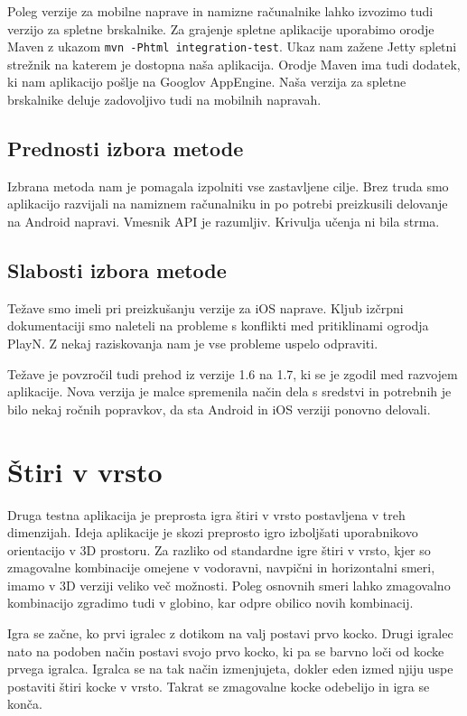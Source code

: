 Poleg verzije za mobilne naprave in namizne računalnike lahko izvozimo tudi verzijo za spletne brskalnike. Za grajenje spletne aplikacije uporabimo orodje Maven z ukazom \texttt{mvn -Phtml integration-test}. Ukaz nam zažene Jetty spletni strežnik na katerem je dostopna naša aplikacija. Orodje Maven ima tudi dodatek, ki nam aplikacijo pošlje na Googlov AppEngine. Naša verzija za spletne brskalnike deluje zadovoljivo tudi na mobilnih napravah.

\subsection{Prednosti izbora metode}

Izbrana metoda nam je pomagala izpolniti vse zastavljene cilje. Brez truda smo aplikacijo razvijali na namiznem računalniku in po potrebi preizkusili delovanje na Android napravi. Vmesnik API je razumljiv. Krivulja učenja ni bila strma. 

\subsection{Slabosti izbora metode}

Težave smo imeli pri preizkušanju verzije za iOS naprave. Kljub izčrpni dokumentaciji smo naleteli na probleme s konflikti med pritiklinami ogrodja PlayN. Z nekaj raziskovanja nam je vse probleme uspelo odpraviti. 

Težave je povzročil tudi prehod iz verzije 1.6 na 1.7, ki se je zgodil med razvojem aplikacije. Nova verzija je malce spremenila način dela s sredstvi in potrebnih je bilo nekaj ročnih popravkov, da sta Android in iOS verziji ponovno delovali.

\section{Štiri v vrsto}

Druga testna aplikacija je preprosta igra štiri v vrsto postavljena v treh dimenzijah. Ideja aplikacije je skozi preprosto igro izboljšati uporabnikovo orientacijo v 3D prostoru. Za razliko od standardne igre štiri v vrsto, kjer so zmagovalne kombinacije omejene v vodoravni, navpični in horizontalni smeri, imamo v 3D verziji veliko več možnosti. Poleg osnovnih smeri lahko zmagovalno kombinacijo zgradimo tudi v globino, kar odpre obilico novih kombinacij.

Igra se začne, ko prvi igralec z dotikom na valj postavi prvo kocko. Drugi igralec nato na podoben način postavi svojo prvo kocko, ki pa se barvno loči od kocke prvega igralca. Igralca se na tak način izmenjujeta, dokler eden izmed njiju uspe postaviti štiri kocke v vrsto. Takrat se zmagovalne kocke odebelijo in igra se konča.

